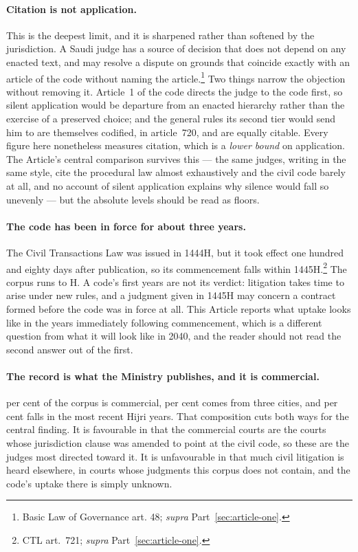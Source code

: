 \documentclass[12pt]{article}
\begin{document}
\paragraph{Citation is not application.} This is the deepest limit, and it is
sharpened rather than softened by the jurisdiction. A Saudi judge has a source
of decision that does not depend on any enacted text, and may resolve a
dispute on grounds that coincide exactly with an article of the code without
naming the article.\footnote{Basic Law of Governance art. 48; \emph{supra}
Part~\ref{sec:article-one}.} Two things narrow the objection without removing
it. Article~1 of the code directs the judge to the code first, so silent
application would be departure from an enacted hierarchy rather than the
exercise of a preserved choice; and the general rules its second tier would
send him to are themselves codified, in article~720, and are equally citable.
Every figure here nonetheless measures citation, which is a
\emph{lower bound} on application. The Article's central comparison survives
this --- the same judges, writing in the same style, cite the procedural law
almost exhaustively and the civil code barely at all, and no account of
silent application explains why silence would fall so unevenly --- but the
absolute levels should be read as floors.

\paragraph{The code has been in force for about three years.} The Civil
Transactions Law was issued in 1444H, but it took effect one hundred and
eighty days after publication, so its commencement falls within
1445H.\footnote{CTL art.~721; \emph{supra} Part~\ref{sec:article-one}.} The
corpus runs to \nLastYear{}H. A code's first years are not its verdict:
litigation takes time to arise under new rules, and a judgment given in 1445H
may concern a contract formed before the code was in force at all. This
Article reports what uptake looks like in the years immediately following
commencement, which is a different question from what it will look like in
2040, and the reader should not read the second answer out of the first.

\paragraph{The record is what the Ministry publishes, and it is commercial.}
\nCommercialShare{} per cent of the corpus is commercial, \nTopCitiesShare{}
per cent comes from three cities, and \nRecentShare{} per cent falls in the
most recent Hijri years. That composition cuts both ways for the central
finding. It is favourable in that the commercial courts are the courts whose
jurisdiction clause was amended to point at the civil code, so these are the
judges most directed toward it. It is unfavourable in that much civil
litigation is heard elsewhere, in courts whose judgments this corpus does not
contain, and the code's uptake there is simply unknown.
\end{document}
